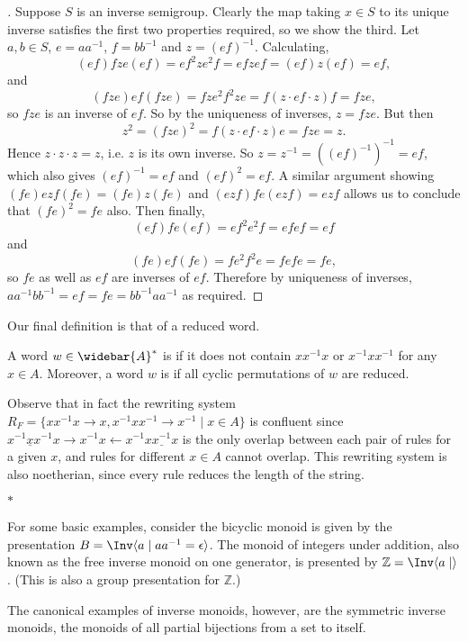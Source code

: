 \documentclass[noindex,noinsetproof,emphthm,12pt]{lmaths}
\newcommand{\paradec}{\par\begin{center}$\ast$\end{center}}
\newcommand{\Abar}{\widebar{A}}
\begin{document}
\begin{proof}[ ]
	Suppose $S$ is an inverse semigroup. Clearly the map taking $x \in S$ to its unique inverse satisfies the first two properties required, so we show the third. Let $a, b \in S$, $e = aa^{-1}$, $f = bb^{-1}$ and $z = (ef)^{-1}$. Calculating,
	\[ (ef)fze(ef) = ef^2ze^2f = efzef = (ef)z(ef) = ef, \]
	and
	\[ (fze)ef(fze) = fze^2f^2ze = f(z\cdot ef\cdot z)f = fze, \]
	so $fze$ is an inverse of $ef$. So by the uniqueness of inverses, $z = fze$. But then
	\[ z^2 = (fze)^2 = f(z\cdot ef \cdot z)e = fze = z. \]
	Hence $z\cdot z\cdot z = z$, i.e. $z$ is its own inverse. So $z = z^{-1} = ((ef)^{-1})^{-1} = ef$, which also gives $(ef)^{-1} = ef$ and $(ef)^2 = ef$. A similar argument showing $(fe)ezf(fe) = (fe)z(fe)$ and $(ezf)fe(ezf) = ezf$ allows us to conclude that $(fe)^2 = fe$ also. Then finally,
	\[ (ef)fe(ef) = ef^2e^2f = efef = ef \]
	and
	\[ (fe)ef(fe) = fe^2f^2e = fefe = fe, \]
	so $fe$ as well as $ef$ are inverses of $ef$. Therefore by uniqueness of inverses, $aa^{-1}bb^{-1} = ef = fe = bb^{-1}aa^{-1}$ as required.
\end{proof}

Our final definition is that of a reduced word.

\begin{defn}
	A word $w \in \Abar^*$ is  if it does not contain $xx^{-1}x$ or $x^{-1}xx^{-1}$ for any $x \in A$. Moreover, a word $w$ is  if all cyclic permutations of $w$ are reduced.
\end{defn}

Observe that in fact the rewriting system $R_F = \{ xx^{-1}x \to x, x^{-1}xx^{-1} \to x^{-1} \mid x \in A\}$ is confluent since $\underline{x^{-1}xx^{-1}}x \to x^{-1}x \leftarrow x^{-1}\underline{xx^{-1}x}$ is the only overlap between each pair of rules for a given $x$, and rules for different $x \in A$ cannot overlap. This rewriting system is also noetherian, since every rule reduces the length of the string.

\paradec
For some basic examples, consider the bicyclic monoid is given by the presentation $B = \Inv \langle a \mid aa^{-1} = \epsilon \rangle$. The monoid of integers under addition, also known as the free inverse monoid on one generator, is presented by $\mathbb{Z} = \Inv \langle a \mid \rangle$. (This is also a group presentation for $\mathbb{Z}$.)

The canonical examples of inverse monoids, however, are the symmetric inverse monoids, the monoids of all partial bijections from a set to itself.
\end{document}

